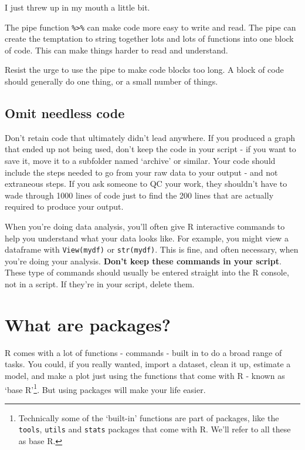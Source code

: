 \documentclass[]{book}
\begin{document}
I just threw up in my mouth a little bit.

The pipe function \texttt{\%\textgreater{}\%} can make code more easy to write and read. The pipe can create the temptation to string together lots and lots of functions into one block of code. This can make things harder to read and understand.

Resist the urge to use the pipe to make code blocks too long. A block of code should generally do one thing, or a small number of things.

\hypertarget{omit-needless-code}{%
\section{Omit needless code}\label{omit-needless-code}}

Don't retain code that ultimately didn't lead anywhere. If you produced a graph that ended up not being used, don't keep the code in your script - if you want to save it, move it to a subfolder named `archive' or similar. Your code should include the steps needed to go from your raw data to your output - and not extraneous steps. If you ask someone to QC your work, they shouldn't have to wade through 1000 lines of code just to find the 200 lines that are actually required to produce your output.

When you're doing data analysis, you'll often give R interactive commands to help you understand what your data looks like. For example, you might view a dataframe with \texttt{View(mydf)} or \texttt{str(mydf)}. This is fine, and often necessary, when you're doing your analysis. \textbf{Don't keep these commands in your script}. These type of commands should usually be entered straight into the R console, not in a script. If they're in your script, delete them.

\hypertarget{packages}{%
\chapter{What are packages?}\label{packages}}

R comes with a lot of functions - commands - built in to do a broad range of tasks. You could, if you really wanted, import a dataset, clean it up, estimate a model, and make a plot just using the functions that come with R - known as `base R'\footnote{Technically some of the `built-in' functions are part of packages, like the \texttt{tools}, \texttt{utils} and \texttt{stats} packages that come with R. We'll refer to all these as base R.}. But using packages will make your life easier.
\end{document}
